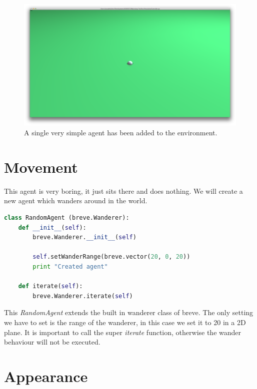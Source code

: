 \begin{figure}[htbp]
\begin{center}
\includegraphics{graphics/simpleagent}
\caption{A single very simple agent has been added to the environment.}
\end{center}
\end{figure}

\section{Movement}
This agent is very boring, it just sits there and does nothing. We will create a new agent which wanders around in the world.

\begin{fullwidth}
\begin{lstlisting}[language=Python]
class RandomAgent (breve.Wanderer):
	def __init__(self):
		breve.Wanderer.__init__(self)

		self.setWanderRange(breve.vector(20, 0, 20))
		print "Created agent"

	def iterate(self):
		breve.Wanderer.iterate(self)
\end{lstlisting}
\end{fullwidth}


This \textit{RandomAgent} extends the built in wanderer class of breve. The only setting we have to set is the range of the wanderer, in this case we set it to 20 in a 2D plane. It is important to call the super \textit{iterate} function, otherwise the wander behaviour will not be executed.

\section{Appearance}

